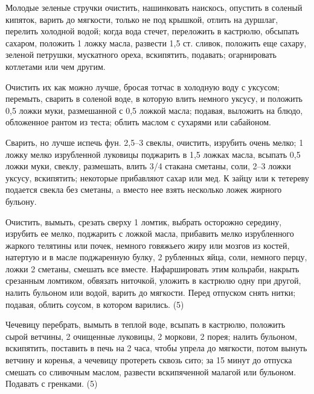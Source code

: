 
Молодые зеленые стручки очистить, нашинковать наискось, опустить в соленый кипяток, варить до мягкости, только не под крышкой, отлить на дуршлаг, перелить холодной водой; когда вода стечет, переложить в кастрюлю, обсыпать сахаром, положить 1 ложку масла, развести 1,5 ст. сливок, положить еще сахару, зеленой петрушки, мускатного ореха, вскипятить, подавать; огарнировать котлетами или чем другим. 


Очистить их как можно лучше, бросая тотчас в холодную воду с уксусом; перемыть, сварить в соленой воде, в которую влить немного уксусу, и положить 0,5 ложки муки, размешанной с 0,5 ложкой масла; подавая, выложить на блюдо, обложенное рантом из теста; облить маслом с сухарями или сабайоном. 


Сварить, но лучше испечь фун. 2,5--3 свеклы, очистить, изрубить очень мелко; 1 ложку мелко изрубленной луковицы поджарить в 1,5 ложках масла, всыпать 0,5 ложки муки, свеклу, размешать, влить 3/4 стакана сметаны, соли, 2--3 ложки уксусу, вскипятить; некоторые прибавляют сахар или мед. К зайцу или к тетереву подается свекла без сметаны, a вместо нее взять несколько ложек жирного бульону. 


Очистить, вымыть, срезать сверху 1 ломтик, выбрать осторожно середину, изрубить ее мелко, поджарить с ложкой масла, прибавить мелко изрубленного жаркого телятины или почек, немного говяжьего жиру или мозгов из костей, натертую и в масле поджаренную булку, 2 рубленных яйца, соли, немного перцу, ложки 2 сметаны, смешать все вместе. Нафаршировать этим кольраби, накрыть срезанным ломтиком, обвязать ниточкой, уложить в кастрюлю одну при другой, налить бульоном или водой, варить до мягкости. Перед отпуском снять нитки; подавая, облить соусом, в котором варились. (5) 


Чечевицу перебрать, вымыть в теплой воде, всыпать в кастрюлю, положить сырой ветчины, 2 очищенные луковицы, 2 моркови, 2 порея; налить бульоном, вскипятить, поставить в печь на 2 часа, чтобы упрела до мягкости, потом вынуть ветчину и коренья, а чечевицу протереть сквозь сито; за 15 минут до отпуска смешать со сливочным маслом, развести вскипяченной малагой или бульоном. Подавать с гренками. (5) 

